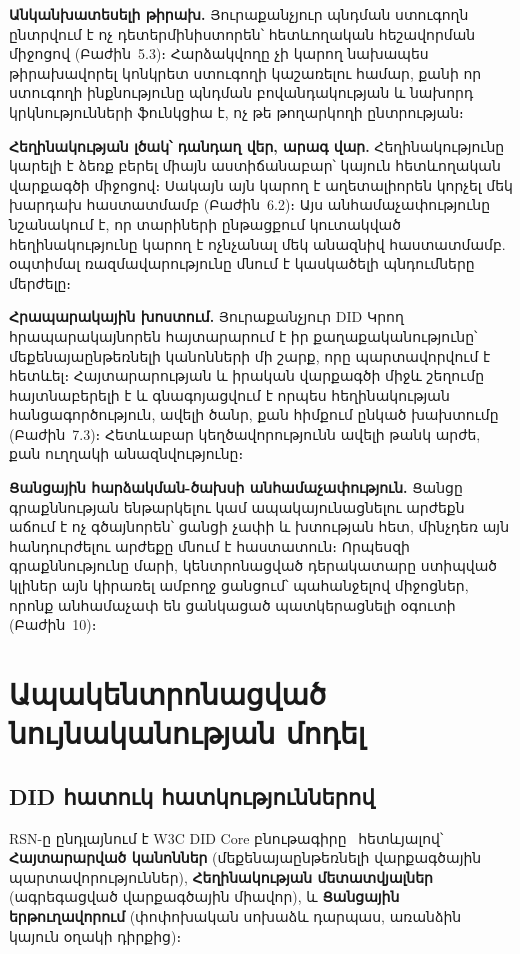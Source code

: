 \documentclass[11pt,a4paper,twocolumn]{article}
\begin{document}
\textbf{Անկանխատեսելի թիրախ.} Յուրաքանչյուր պնդման ստուգողն ընտրվում է ոչ դետերմինիստորեն՝ հետևողական հեշավորման միջոցով (Բաժին~5.3)։ Հարձակվողը չի կարող նախապես թիրախավորել կոնկրետ ստուգողի կաշառելու համար, քանի որ ստուգողի ինքնությունը պնդման բովանդակության և նախորդ կրկնությունների ֆունկցիա է, ոչ թե թողարկողի ընտրության։

\textbf{Հեղինակության լծակ՝ դանդաղ վեր, արագ վար.} Հեղինակությունը կարելի է ձեռք բերել միայն աստիճանաբար՝ կայուն հետևողական վարքագծի միջոցով։ Սակայն այն կարող է աղետալիորեն կորչել մեկ խարդախ հաստատմամբ (Բաժին~6.2)։ Այս անհամաչափությունը նշանակում է, որ տարիների ընթացքում կուտակված հեղինակությունը կարող է ոչնչանալ մեկ անազնիվ հաստատմամբ. օպտիմալ ռազմավարությունը մնում է կասկածելի պնդումները մերժելը։

\textbf{Հրապարակային խոստում.} Յուրաքանչյուր DID Կրող հրապարակայնորեն հայտարարում է իր քաղաքականությունը՝ մեքենայաընթեռնելի կանոնների մի շարք, որը պարտավորվում է հետևել։ Հայտարարության և իրական վարքագծի միջև շեղումը հայտնաբերելի է և գնագոյացվում է որպես հեղինակության հանցագործություն, ավելի ծանր, քան հիմքում ընկած խախտումը (Բաժին~7.3)։ Հետևաբար կեղծավորությունն ավելի թանկ արժե, քան ուղղակի անազնվությունը։

\textbf{Ցանցային հարձակման-ծախսի անհամաչափություն.} Ցանցը գրաքննության ենթարկելու կամ ապակայունացնելու արժեքն աճում է ոչ գծայնորեն՝ ցանցի չափի և խտության հետ, մինչդեռ այն հանդուրժելու արժեքը մնում է հաստատուն։ Որպեսզի գրաքննությունը մարի, կենտրոնացված դերակատարը ստիպված կլիներ այն կիրառել ամբողջ ցանցում՝ պահանջելով միջոցներ, որոնք անհամաչափ են ցանկացած պատկերացնելի օգուտի (Բաժին~10)։

\section{Ապակենտրոնացված նույնականության մոդել}

\subsection{DID հատուկ հատկություններով}

RSN-ը ընդլայնում է W3C DID Core բնութագիրը~\cite{did2022} հետևյալով՝ \textbf{Հայտարարված կանոններ} (մեքենայաընթեռնելի վարքագծային պարտավորություններ), \textbf{Հեղինակության մետատվյալներ} (ագրեգացված վարքագծային միավոր), և \textbf{Ցանցային երթուղավորում} (փոփոխական սոխաձև դարպաս, առանձին կայուն օղակի դիրքից)։
\end{document}
